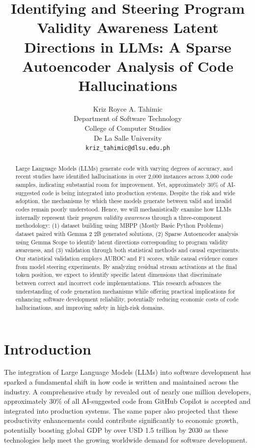 \documentclass[11pt]{article}
\title{Identifying and Steering Program Validity Awareness Latent Directions in LLMs: A Sparse Autoencoder Analysis of Code Hallucinations}
\author{Kriz Royce A. Tahimic \\
  Department of Software Technology\\
  College of Computer Studies\\
  De La Salle University \\
  \texttt{kriz\_tahimic@dlsu.edu.ph}}
\begin{document}
\maketitle
\begin{abstract}
Large Language Models (LLMs) generate code with varying degrees of accuracy, and recent studies have identified hallucinations in over 2,000 instances across 3,000 code samples, indicating substantial room for improvement. Yet, approximately 30\% of AI-suggested code is being integrated into production systems. Despite the risk and wide adoption, the mechanisms by which these models generate between valid and invalid codes remain poorly understood. Hence, we will mechanistically examine how LLMs internally represent their \textit{program validity awareness} through a three-component methodology: (1) dataset building using MBPP (Mostly Basic Python Problems) dataset paired with Gemma 2 2B generated solutions, (2) Sparse Autoencoder analysis using Gemma Scope to identify latent directions corresponding to program validity awareness, and (3) validation through both statistical methods and causal experiments. Our statistical validation employs AUROC and F1 scores, while causal evidence comes from model steering experiments. By analyzing residual stream activations at the final token position, we expect to identify specific latent dimensions that discriminate between correct and incorrect code implementations. This research advances the understanding of code generation mechanisms while offering practical implications for enhancing software development reliability, potentially reducing economic costs of code hallucinations, and improving safety in high-risk domains.
\end{abstract}

\section{Introduction}

The integration of Large Language Models (LLMs) into software development has sparked a fundamental shift in how code is written and maintained across the industry. A comprehensive study by \citet{dohmke2023sea} revealed out of nearly one million developers, approximately 30\% of all AI-suggested code from GitHub Copilot is accepted and integrated into production systems. The same paper also projected that these productivity enhancements could contribute significantly to economic growth, potentially boosting global GDP by over USD 1.5 trillion by 2030 as these technologies help meet the growing worldwide demand for software development.
\end{document}
